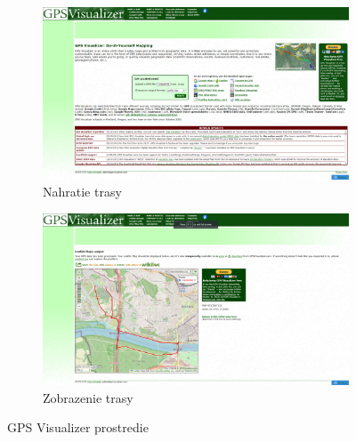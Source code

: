 \begin{figure}[H]
  \centering
  \begin{subfigure}{.7\textwidth}
    \centering
    \includegraphics[width=1\textwidth]{img/gps_visualizer/gpsvisualizer1.png}
    \caption{Nahratie trasy}
  \end{subfigure}
  \begin{subfigure}{.7\textwidth}
    \centering
    \includegraphics[width=1\textwidth]{img/gps_visualizer/gpsvisualizer2.png}
    \caption{Zobrazenie trasy}
  \end{subfigure}
  \caption{GPS Visualizer prostredie}
  \label{fig:gps-visualizer}
\end{figure}